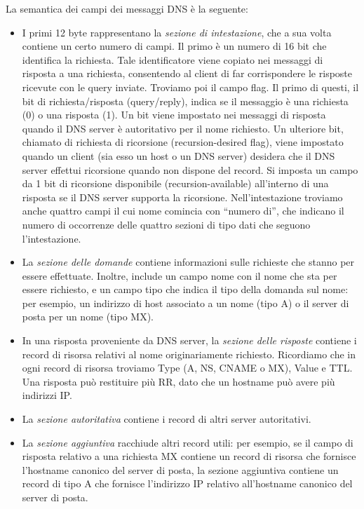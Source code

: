La semantica dei campi dei messaggi DNS è la seguente:
\begin{itemize}
    \item I primi 12 byte rappresentano la \textit{sezione di intestazione}, che a sua volta contiene un certo numero di campi. Il primo è un numero di 16 bit che identifica la richiesta. Tale identificatore viene copiato nei messaggi di risposta a una richiesta, consentendo al client di far corrispondere le risposte ricevute con le query inviate. Troviamo poi il campo flag. Il primo di questi, il bit di richiesta/risposta (query/reply), indica se il messaggio è una richiesta (0) o una risposta (1). Un bit viene impostato nei messaggi di risposta quando il DNS server è autoritativo per il nome richiesto. Un ulteriore bit, chiamato di richiesta di ricorsione (recursion-desired flag), viene impostato quando un client (sia esso un host o un DNS server) desidera che il DNS server effettui ricorsione quando non dispone del record. Si imposta un campo da 1 bit di ricorsione disponibile (recursion-available) all'interno di una risposta se il DNS server supporta la ricorsione. Nell'intestazione troviamo anche quattro campi il cui nome comincia con “numero di”, che indicano il numero di occorrenze delle quattro sezioni di tipo dati che seguono l'intestazione.
    \item La \textit{sezione delle domande} contiene informazioni sulle richieste che stanno per essere effettuate. Inoltre, include un campo nome con il nome che sta per essere richiesto, e un campo tipo che indica il tipo della domanda sul nome: per esempio, un indirizzo di host associato a un nome (tipo A) o il server di posta per un nome (tipo MX).
    \item In una risposta proveniente da DNS server, la \textit{sezione delle risposte} contiene i record di risorsa relativi al nome originariamente richiesto. Ricordiamo che in ogni record di risorsa troviamo Type (A, NS, CNAME o MX), Value e TTL. Una risposta può restituire più RR, dato che un hostname può avere più indirizzi IP.
    \item La \textit{sezione autoritativa} contiene i record di altri server autoritativi.
    \item La \textit{sezione aggiuntiva} racchiude altri record utili: per esempio, se il campo di risposta relativo a una richiesta MX contiene un record di risorsa che fornisce l'hostname canonico del server di posta, la sezione aggiuntiva contiene un record di tipo A che fornisce l'indirizzo IP relativo all'hostname canonico del server di posta.
\end{itemize}

